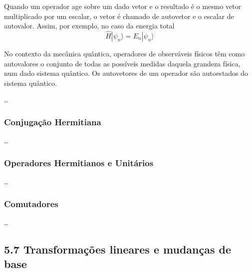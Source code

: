 \documentclass[11pt]{article}
\begin{document}
Quando um operador age sobre um dado vetor e o resultado é o mesmo vetor
multiplicado por um escalar, o vetor é chamado de autovetor e o escalar
de autovalor. Assim, por exemplo, no caso da energia total \[
\hat{H}|\psi_n\rangle = E_n |\psi_n \rangle
\]

    No contexto da mecânica quântica, operadores de observáveis físicos têm
como autovalores o conjunto de todas as possíveis medidas daquela
grandeza física, num dado sistema quântico. Os autovetores de um
operador são autoestados do sistema quântico.

\ldots{}

\hypertarget{conjugauxe7uxe3o-hermitiana}{%
\subsubsection{Conjugação
Hermitiana}\label{conjugauxe7uxe3o-hermitiana}}

\ldots{}

\hypertarget{operadores-hermitianos-e-unituxe1rios}{%
\subsubsection{Operadores Hermitianos e
Unitários}\label{operadores-hermitianos-e-unituxe1rios}}

\ldots{}

\hypertarget{comutadores}{%
\subsubsection{Comutadores}\label{comutadores}}

\ldots{}

\hypertarget{transformauxe7uxf5es-lineares-e-mudanuxe7as-de-base}{%
\subsection{5.7 Transformações lineares e mudanças de
base}\label{transformauxe7uxf5es-lineares-e-mudanuxe7as-de-base}}


    
    
    
\end{document}

